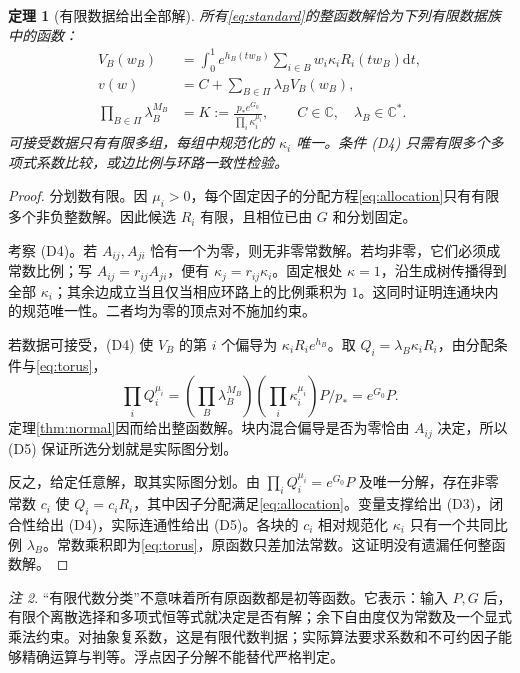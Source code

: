 \documentclass[UTF8,11pt,a4paper,fontset=fandol]{ctexart}
\newtheorem{theorem}{定理}[section]
\theoremstyle{definition}\newtheorem{definition}[theorem]{定义}
\theoremstyle{remark}\newtheorem{remark}[theorem]{注}
\newcommand{\C}{\mathbb C}\newcommand{\N}{\mathbb N}
\newcommand{\dd}{\mathrm d}\newcommand{\OO}{\mathcal O}
\begin{document}
\begin{theorem}[有限数据给出全部解]\label{thm:finite}
所有\eqref{eq:standard}的整函数解恰为下列有限数据族中的函数：
\begin{align}
V_B(w_B)&=\int_0^1 e^{h_B(tw_B)}\sum_{i\in B}w_i\kappa_iR_i(tw_B)\dd t,\label{eq:VB}\\
v(w)&=C+\sum_{B\in\Pi}\lambda_BV_B(w_B),\label{eq:family}\\
\prod_{B\in\Pi}\lambda_B^{M_B}
&=K:=\frac{p_*e^{G_0}}{\prod_i\kappa_i^{\mu_i}},\qquad C\in\C,\quad\lambda_B\in\C^*.\label{eq:torus}
\end{align}
可接受数据只有有限多组，每组中规范化的 $\kappa_i$ 唯一。条件 (D4) 只需有限多个多项式系数比较，或边比例与环路一致性检验。
\end{theorem}
\begin{proof}
分划数有限。因 $\mu_i>0$，每个固定因子的分配方程\eqref{eq:allocation}只有有限多个非负整数解。因此候选 $R_i$ 有限，且相位已由 $G$ 和分划固定。

考察 (D4)。若 $A_{ij},A_{ji}$ 恰有一个为零，则无非零常数解。若均非零，它们必须成常数比例；写 $A_{ij}=r_{ij}A_{ji}$，便有 $\kappa_j=r_{ij}\kappa_i$。固定根处 $\kappa=1$，沿生成树传播得到全部 $\kappa_i$；其余边成立当且仅当相应环路上的比例乘积为 $1$。这同时证明连通块内的规范唯一性。二者均为零的顶点对不施加约束。

若数据可接受，(D4) 使 $V_B$ 的第 $i$ 个偏导为 $\kappa_iR_i e^{h_B}$。取 $Q_i=\lambda_B\kappa_iR_i$，由分配条件与\eqref{eq:torus}，
\[
\prod_iQ_i^{\mu_i}
=\left(\prod_B\lambda_B^{M_B}\right)
\left(\prod_i\kappa_i^{\mu_i}\right)P/p_*=e^{G_0}P.
\]
定理\ref{thm:normal}因而给出整函数解。块内混合偏导是否为零恰由 $A_{ij}$ 决定，所以 (D5) 保证所选分划就是实际图分划。

反之，给定任意解，取其实际图分划。由 $\prod_iQ_i^{\mu_i}=e^{G_0}P$ 及唯一分解，存在非零常数 $c_i$ 使 $Q_i=c_iR_i$，其中因子分配满足\eqref{eq:allocation}。变量支撑给出 (D3)，闭合性给出 (D4)，实际连通性给出 (D5)。各块的 $c_i$ 相对规范化 $\kappa_i$ 只有一个共同比例 $\lambda_B$。常数乘积即为\eqref{eq:torus}，原函数只差加法常数。这证明没有遗漏任何整函数解。
\end{proof}

\begin{remark}
“有限代数分类”不意味着所有原函数都是初等函数。它表示：输入 $P,G$ 后，有限个离散选择和多项式恒等式就决定是否有解；余下自由度仅为常数及一个显式乘法约束。对抽象复系数，这是有限代数判据；实际算法要求系数和不可约因子能够精确运算与判等。浮点因子分解不能替代严格判定。
\end{remark}
\end{document}
